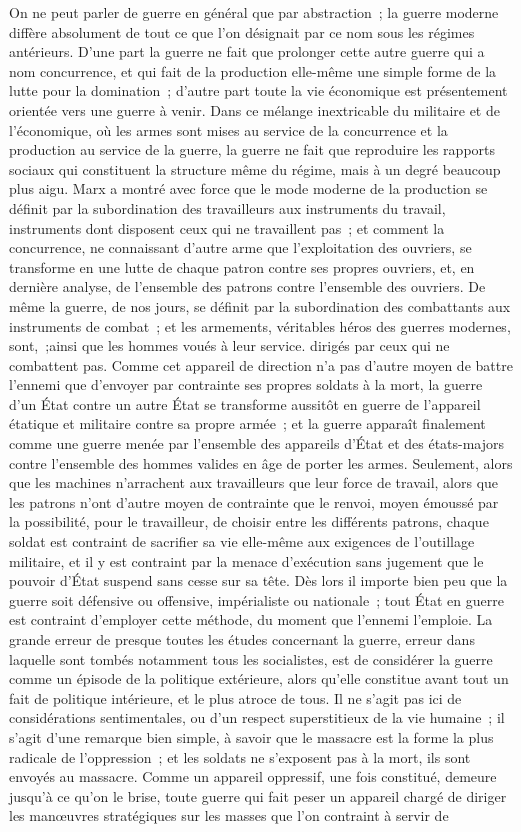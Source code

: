\documentclass[french,twoside]{book} %
\begin{document}
On ne peut parler de guerre en général que par abstraction ; la guerre moderne diffère absolument de tout ce que l'on désignait par ce nom sous les régimes antérieurs. D'une part la guerre ne fait que prolonger cette autre guer­re qui a nom concurrence, et qui fait de la production elle-même une simple forme de la lutte pour la domination ; d'autre part toute la vie économique est présentement orientée vers une guerre à venir. Dans ce mélange inextricable du militaire et de l'économique, où les armes sont mises au service de la concurrence et la production au service de la guerre, la guerre ne fait que reproduire les rapports sociaux qui constituent la structure même du régime, mais à un degré beaucoup plus aigu. Marx a montré avec force que le mode moderne de la production se définit par la subordination des travailleurs aux instruments du travail, instruments dont disposent ceux qui ne travaillent pas ; et comment la concurrence, ne connaissant d'autre arme que l'exploitation des ouvriers, se transforme en une lutte de chaque patron contre ses propres ouvriers, et, en dernière analyse, de l'ensemble des patrons contre l'ensemble des ouvriers. De même la guerre, de nos jours, se définit par la subordination des combattants aux instruments de combat ; et les armements, véritables héros des guerres modernes, sont, ;ainsi que les hommes voués à leur service. dirigés par ceux qui ne combattent pas. Comme cet appareil de direction n’a pas d'autre moyen de battre l'ennemi que d'envoyer par contrainte ses propres soldats à la mort, la guerre d'un État contre un autre État se transforme aussitôt en guerre de l'appareil étatique et militaire contre sa propre armée ; et la guerre apparaît finalement comme une guerre menée par l'ensemble des appareils d'État et des états-majors contre l'ensemble des hommes valides en âge de porter les armes. Seulement, alors que les machines n'arrachent aux travailleurs que leur force de travail, alors que les patrons n'ont d'autre moyen de contrainte que le renvoi, moyen émoussé par la possibilité, pour le travailleur, de choisir entre les différents patrons, chaque soldat est contraint de sacrifier sa vie elle-même aux exigences de l'outillage militaire, et il y est contraint par la menace d'exécution sans jugement que le pouvoir d'État suspend sans cesse sur sa tête. Dès lors il importe bien peu que la guerre soit défensive ou offensive, impérialiste ou nationale ; tout État en guerre est contraint d'employer cette méthode, du moment que l'ennemi l'emploie. La grande erreur de presque toutes les études concernant la guerre, erreur dans laquelle sont tombés notamment tous les socialistes, est de considérer la guerre comme un épisode de la politique extérieure, alors qu'elle constitue avant tout un fait de politique intérieure, et le plus atroce de tous. Il ne s'agit pas ici de considérations sentimentales, ou d'un respect superstitieux de la vie humaine ; il s'agit d'une remarque bien simple, à savoir que le massacre est la forme la plus radicale de l'oppression ; et les soldats ne s'exposent pas à la mort, ils sont envoyés au massacre. Comme un appareil oppressif, une fois constitué, demeure jusqu'à ce qu'on le brise, toute guerre qui fait peser un appareil chargé de diriger les manœuvres stratégiques sur les masses que l'on contraint à servir de 
\end{document}
